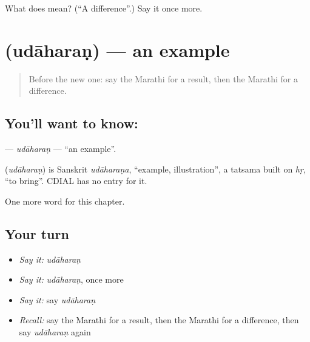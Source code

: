 \begin{tcolorbox}[breakable,colback=teal!4,colframe=teal!35!black,title={Before you move on}]
What does  mean? (\textquotedblleft{}A difference\textquotedblright{}.) Say it once more.
\end{tcolorbox}
\section[\texorpdfstring{\mr{उदाहरण} (udāharaṇ)}{उदाहरण (udāharaṇ)}]{ (udāharaṇ) — an example}

\label{lesson:MR-C239-udaharan}



\begin{quote}
Before the new one: say the Marathi for a result, then the Marathi for a difference.
\end{quote}

\subsection*{You'll want to know: }
\textbf{} — \emph{udāharaṇ} — \textquotedblleft{}an example\textquotedblright{}.

\begin{cousinweb}
\textbf{} (\emph{udāharaṇ}) is Sanskrit \emph{udāharaṇa}, \textquotedblleft{}example, illustration\textquotedblright{}, a tatsama built on \emph{hṛ}, \textquotedblleft{}to bring\textquotedblright{}. CDIAL has no entry for it.
\end{cousinweb}

\begin{grammarlens}[title={What you've built}]
One more word for this chapter.
\end{grammarlens}

\subsection*{Your turn}
\begin{itemize}
\raggedright
  \item \emph{Say it:} \emph{udāharaṇ}
  \item \emph{Say it:} \emph{udāharaṇ}, once more
  \item \emph{Say it:} say \emph{udāharaṇ}
  \item \emph{Recall:} say the Marathi for a result, then the Marathi for a difference, then say \emph{udāharaṇ} again
\end{itemize}

